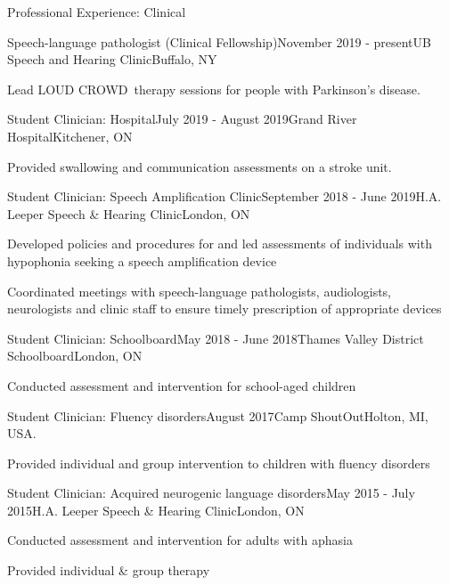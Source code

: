 \documentclass{resume} %
\begin{document}
\begin{rSection}{Professional Experience: Clinical}

	\begin{rSubsection}{Speech-language pathologist (Clinical Fellowship)}{November 2019 - present}{UB Speech and Hearing Clinic}{Buffalo, NY}
	\item Lead LOUD CROWD\textregistered \ therapy sessions for people with Parkinson's disease.
	\end{rSubsection}

	\begin{rSubsection}{Student Clinician: Hospital}{July 2019 - August 2019}{Grand River Hospital}{Kitchener, ON}
	\item Provided swallowing and communication assessments on a stroke unit.
	\end{rSubsection}

	\begin{rSubsection}{Student Clinician: Speech Amplification Clinic}{September 2018 - June 2019}{H.A. Leeper Speech \& Hearing Clinic}{London, ON}
	\item Developed policies and procedures for and led assessments of individuals with hypophonia seeking a speech amplification device
	\item Coordinated meetings with speech-language pathologists, audiologists, neurologists and clinic staff to ensure timely prescription of appropriate devices
	\end{rSubsection}

	\begin{rSubsection}{Student Clinician: Schoolboard}{May 2018 - June 2018}{Thames Valley District Schoolboard}{London, ON}
	\item Conducted assessment and intervention for school-aged children
	\end{rSubsection}
	
	\begin{rSubsection}{Student Clinician: Fluency disorders}{August 2017}{Camp ShoutOut}{Holton, MI, USA.}
	\item Provided individual and group intervention to children with fluency disorders
	\end{rSubsection}
	
	
	\begin{rSubsection}{Student Clinician: Acquired neurogenic language disorders}{May 2015 - July 2015}{H.A. Leeper Speech \& Hearing Clinic}{London, ON}
	\item Conducted assessment and intervention for adults with aphasia
	\item Provided individual \& group therapy
	\end{rSubsection}
	

\end{rSection}
\end{document}
